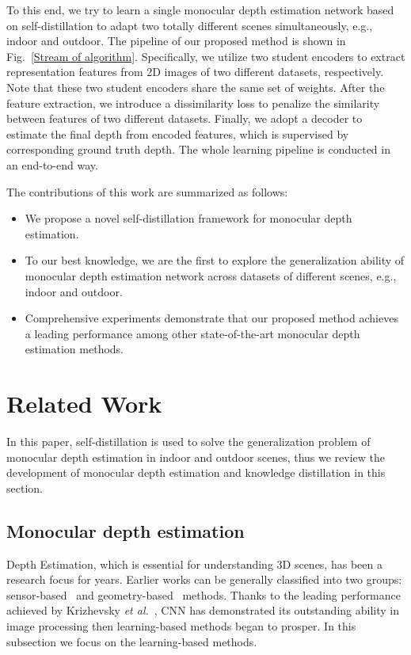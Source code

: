 \documentclass{svjour3}                     %
\begin{document}
To this end, we try to learn a single monocular depth estimation network based on self-distillation to adapt two totally different scenes simultaneously, e.g., indoor and outdoor. The pipeline of our proposed method is shown in Fig.~\ref{Stream of algorithm}. Specifically, we utilize two student encoders to extract representation features from 2D images of two different datasets, respectively. Note that these two student encoders share the same set of weights. After the feature extraction, we introduce a dissimilarity loss to penalize the similarity between features of two different datasets. Finally, we adopt a decoder to estimate the final depth from encoded features, which is supervised by corresponding ground truth depth. The whole learning pipeline is conducted in an end-to-end way.

The contributions of this work are summarized as follows:
\begin{itemize}
  \item We propose a novel self-distillation framework for monocular depth estimation.
  \item To our best knowledge, we are the first to explore the generalization ability of monocular depth estimation network across datasets of different scenes, e.g., indoor and outdoor.  
  \item Comprehensive experiments demonstrate that our proposed method achieves a leading performance among other state-of-the-art monocular depth estimation methods.
\end{itemize}

\section{Related Work}
In this paper, self-distillation is used to solve the generalization 
problem of monocular depth estimation in indoor and outdoor scenes,
thus we review the development of monocular depth estimation and
knowledge distillation in this section.

\subsection{Monocular depth estimation}
Depth Estimation, which is essential for understanding 3D
scenes, has been a research focus for years. Earlier works
can be generally classified into two groups:
sensor-based~\cite{zhang2012microsoft,yoneda2014lidar} and geometry-based~\cite{zou2010method,cao2015summary,ullman1979interpretation} methods. Thanks to the leading performance achieved by Krizhevsky \emph{et al.}~\cite{10.1145/3065386}, CNN has 
demonstrated its outstanding ability in image processing then
learning-based methods 
began to prosper. In this subsection we focus on the learning-based
methods.
\end{document}
